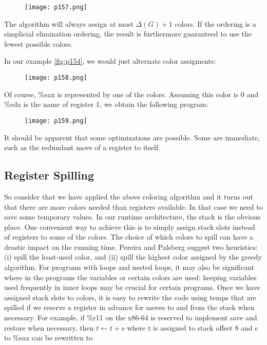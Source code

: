 \begin{figure}[H]
	\centering
	\texttt{[image: p157.png]}
	\caption{}
	\label{fig:p157}
\end{figure}


The algorithm will always assign at most $\Delta(G)+1$  colors. If the ordering
is a simplicial elimination ordering, the result is furthermore guaranteed to
use the fewest possible colors.

In our example \ref{fig:p154}, we would just alternate color assigments:


\begin{figure}[H]
	\centering
	\texttt{[image: p158.png]}
	\caption{}
	\label{fig:p158}
\end{figure}

Of course, \%eax is represented by one of the colors. Assuming this color is
0 and \%edx is the name of register 1, we obtain the following program:

\begin{figure}[H]
	\centering
	\texttt{[image: p159.png]}
	\caption{}
	\label{fig:p159}
\end{figure}


It should be apparent that some optimizations are possible. Some are
immediate, such as the redundant move of a register to itself.

\subsection{Register Spilling}


So consider that we have applied the above coloring algorithm and it turns
out that there are more colors needed than registers available. In that case
we need to save some temporary values. In our runtime architecture, the
stack is the obvious place. One convenient way to achieve this is to simply
assign stack slots instead of registers to some of the colors. The choice of
which colors to spill can have a drastic impact on the running time. Pereira
and Palsberg suggest two heuristics: (i) spill the least-used color, and (ii)
spill the highest color assigned by the greedy algorithm. For programs with
loops and nested loops, it may also be significant where in the programs the
variables or certain colors are used: keeping variables used frequently in
inner loops may be crucial for certain programs.
Once we have assigned stack slots to colors, it is easy to rewrite the code
using temps that are spilled if we reserve a register in advance for moves
to and from the stack when necessary. For example, if \%r11 on the x86-64
is reserved to implement save and restore when necessary, then \(t \leftarrow t + s \)
where t is assigned to stack offset 8 and s to \%eax can be rewritten to

